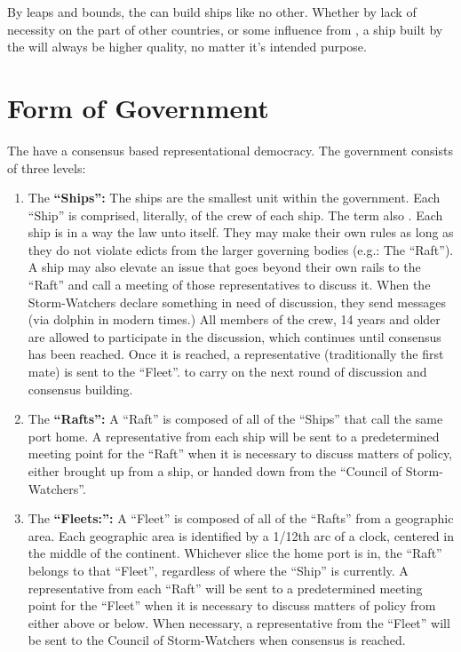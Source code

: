 \documentclass[blue]{GL2020}
\begin{document}
By leaps and bounds, the \pShippies{} can build ships like no other. Whether by lack of necessity on the part of other countries, or some influence from \cSeaGoddess{}, a ship built by the \pShippies{} will always be higher quality, no matter it's intended purpose.

\section*{Form of Government} The \pShippies{} have a consensus based representational democracy. The government consists of three levels:

\begin{enumerate}
	
	\item The {\bf``Ships'':} The ships are the smallest unit within the \pShip{} government. Each ``Ship'' is comprised, literally, of the crew of each ship. The term also . Each ship is in a way the law unto itself. They may make their own rules as long as they do not violate edicts from the larger governing bodies (e.g.: The ``Raft''). A ship may also elevate an issue that goes beyond their own rails to the ``Raft'' and call a meeting of those representatives to discuss it. When the Storm-Watchers declare something in need of discussion, they send messages (via dolphin in modern times.) All members of the crew, 14 years and older are allowed to participate in the discussion, which continues until consensus has been reached. Once it is reached, a representative (traditionally the first mate) is sent to the ``Fleet''. to carry on the next round of discussion and consensus building.
		\item The {\bf ``Rafts'':} A ``Raft'' is composed of all of the ``Ships'' that call the same port home. A representative from each ship will be sent to a predetermined meeting point for the ``Raft'' when it is necessary to discuss matters of policy, either brought up from a ship, or handed down from the ``Council of Storm-Watchers''.
		\item The {\bf``Fleets:'':} A ``Fleet'' is composed of all of the ``Rafts'' from a geographic area. Each geographic area is identified by a 1/12th arc of a clock, centered in the middle of the continent. Whichever slice the home port is in, the ``Raft'' belongs to that ``Fleet'', regardless of where the ``Ship'' is currently. A representative from each ``Raft'' will be sent to a predetermined meeting point for the ``Fleet'' when it is necessary to discuss matters of policy from either above or below. When necessary, a representative from the ``Fleet'' will be sent to the Council of Storm-Watchers when consensus is reached.

\end{enumerate}
\end{document}
